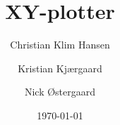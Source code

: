 \documentclass{../mypaper}
\title{XY-plotter}
\author{Christian Klim Hansen \and Kristian Kjærgaard \and Nick Østergaard}
\date{\today}
\begin{document}

\frontmatter

\tableofcontents



\mainmatter








\listoffigures

\listoftables

\listoffixmes
\end{document}
